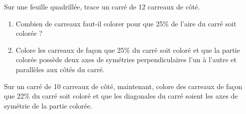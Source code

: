 \begin{myenumerate}
\item Sur une feuille quadrillée, trace un carré de 12 carreaux de
côté.
\begin{enumerate}
\item Combien de carreaux faut-il colorer pour que 25\% de l'aire du
carré soit colorée ?
\item Colore les carreaux de façon que 25\% du carré soit coloré et
que la partie colorée possède deux axes de symétries perpendiculaires
l'un à l'autre et parallèles aux côtés du carré.
\end{enumerate}
\item Sur un carré de 10 carreaux de côté, maintenant, colore des
carreaux de façon que 22\% du carré soit coloré et que les diagonales
du carré soient les axes de symétrie de la partie colorée.
\end{myenumerate}